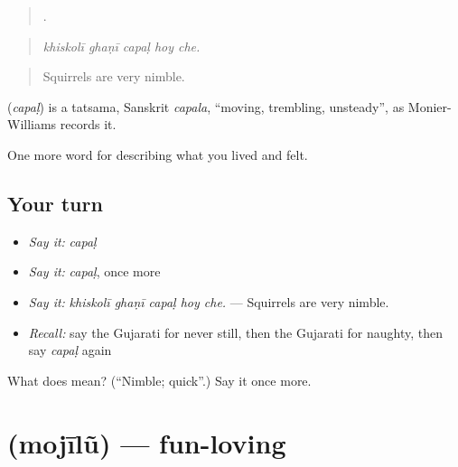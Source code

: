 \begin{quote}
    .
\end{quote}

\begin{quote}
\emph{khiskolī ghaṇī capaḷ hoy che.}
\end{quote}

\begin{quote}
Squirrels are very nimble.
\end{quote}

\begin{cousinweb}
\textbf{} (\emph{capaḷ}) is a tatsama, Sanskrit \emph{capala}, \textquotedblleft{}moving, trembling, unsteady\textquotedblright{}, as Monier-Williams records it.
\end{cousinweb}

\begin{grammarlens}[title={What you've built}]
One more word for describing what you lived and felt.
\end{grammarlens}

\subsection*{Your turn}
\begin{itemize}
\raggedright
  \item \emph{Say it:} \emph{capaḷ}
  \item \emph{Say it:} \emph{capaḷ}, once more
  \item \emph{Say it:} \emph{khiskolī ghaṇī capaḷ hoy che.} — Squirrels are very nimble.
  \item \emph{Recall:} say the Gujarati for never still, then the Gujarati for naughty, then say \emph{capaḷ} again
\end{itemize}

\begin{tcolorbox}[breakable,colback=teal!4,colframe=teal!35!black,title={Before you move on}]
What does  mean? (\textquotedblleft{}Nimble; quick\textquotedblright{}.) Say it once more.
\end{tcolorbox}
\section[\texorpdfstring{\gu{મોજીલું} (mojīlũ)}{મોજીલું (mojīlũ)}]{ (mojīlũ) — fun-loving}

\label{lesson:GU-C462-mojilu}



